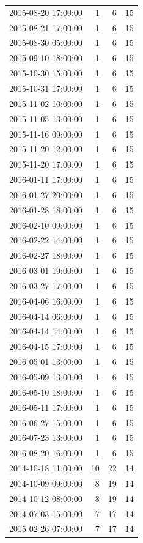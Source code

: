 \begin{tabular}{lrrr}
2015-08-20 17:00:00 & 1 & 6 & 15 \\
2015-08-21 17:00:00 & 1 & 6 & 15 \\
2015-08-30 05:00:00 & 1 & 6 & 15 \\
2015-09-10 18:00:00 & 1 & 6 & 15 \\
2015-10-30 15:00:00 & 1 & 6 & 15 \\
2015-10-31 17:00:00 & 1 & 6 & 15 \\
2015-11-02 10:00:00 & 1 & 6 & 15 \\
2015-11-05 13:00:00 & 1 & 6 & 15 \\
2015-11-16 09:00:00 & 1 & 6 & 15 \\
2015-11-20 12:00:00 & 1 & 6 & 15 \\
2015-11-20 17:00:00 & 1 & 6 & 15 \\
2016-01-11 17:00:00 & 1 & 6 & 15 \\
2016-01-27 20:00:00 & 1 & 6 & 15 \\
2016-01-28 18:00:00 & 1 & 6 & 15 \\
2016-02-10 09:00:00 & 1 & 6 & 15 \\
2016-02-22 14:00:00 & 1 & 6 & 15 \\
2016-02-27 18:00:00 & 1 & 6 & 15 \\
2016-03-01 19:00:00 & 1 & 6 & 15 \\
2016-03-27 17:00:00 & 1 & 6 & 15 \\
2016-04-06 16:00:00 & 1 & 6 & 15 \\
2016-04-14 06:00:00 & 1 & 6 & 15 \\
2016-04-14 14:00:00 & 1 & 6 & 15 \\
2016-04-15 17:00:00 & 1 & 6 & 15 \\
2016-05-01 13:00:00 & 1 & 6 & 15 \\
2016-05-09 13:00:00 & 1 & 6 & 15 \\
2016-05-10 18:00:00 & 1 & 6 & 15 \\
2016-05-11 17:00:00 & 1 & 6 & 15 \\
2016-06-27 15:00:00 & 1 & 6 & 15 \\
2016-07-23 13:00:00 & 1 & 6 & 15 \\
2016-08-20 16:00:00 & 1 & 6 & 15 \\
2014-10-18 11:00:00 & 10 & 22 & 14 \\
2014-10-09 09:00:00 & 8 & 19 & 14 \\
2014-10-12 08:00:00 & 8 & 19 & 14 \\
2014-07-03 15:00:00 & 7 & 17 & 14 \\
2015-02-26 07:00:00 & 7 & 17 & 14 \\

\end{tabular}
